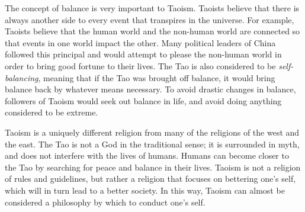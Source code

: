 \documentclass[12pt]{article}
\begin{document}
The concept of balance is very important to Taoism. Taoists believe that there is always another side to every event that transpires in the universe. For example, Taoists believe that the human world and the non-human world are connected so that events in one world impact the other. Many political leaders of China followed this principal and would attempt to please the non-human world in order to bring good fortune to their lives. The Tao is also considered to be \textit{self-balancing}, meaning that if the Tao was brought off balance, it would bring balance back by whatever means necessary. To avoid drastic changes in balance, followers of Taoism would seek out balance in life, and avoid doing anything considered to be extreme.

Taoism is a uniquely different religion from many of the religions of the west and the east. The Tao is not a God in the traditional sense; it is surrounded in myth, and does not interfere with the lives of humans. Humans can become closer to the Tao by searching for peace and balance in their lives. Taoism is not a religion of rules and guidelines, but rather a religion that focuses on bettering one's self, which will in turn lead to a better society. In this way, Taoism can almost be considered a philosophy by which to conduct one's self.
\end{document}
